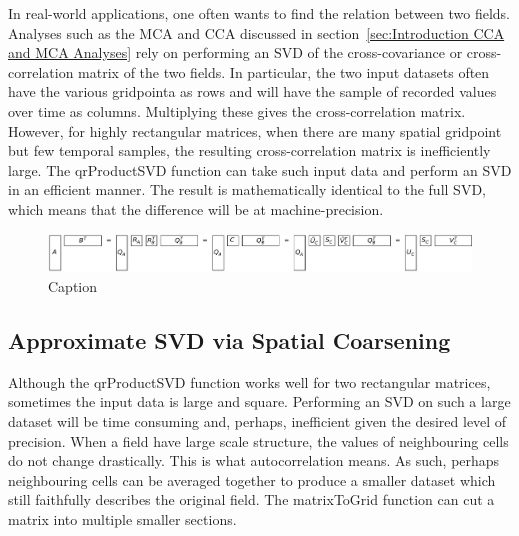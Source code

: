 \documentclass{acm_proc_article-sp}
\begin{document}
In real-world applications, one often wants to find the relation between two fields. Analyses such as the MCA and CCA discussed in section~\ref{sec:Introduction CCA and MCA Analyses} rely on performing an SVD of the cross-covariance or cross-correlation matrix of the two fields. In particular, the two input datasets often have the various gridpointa as rows and will have the sample of recorded values over time as columns. Multiplying these gives the cross-correlation matrix. However, for highly rectangular matrices, when there are many spatial gridpoint but few temporal samples, the resulting cross-correlation matrix is inefficiently large. The qrProductSVD function can take such input data and perform an SVD in an efficient manner. The result is mathematically identical to the full SVD, which means that the difference will be at machine-precision.

\begin{figure}[h]
\begin{center}
\includegraphics[width=\columnwidth]{Results/qrProductSVD.pdf}
\caption[Small caption]{Caption}
\label{fig:qrProductSVD}
\end{center}
\end{figure}
\subsection{Approximate SVD via Spatial Coarsening}
\label{sec:Techniques Approximate SVD via Spatial Coarsening}

Although the qrProductSVD function works well for two rectangular matrices, sometimes the input data is large and square. Performing an SVD on such a large dataset will be time consuming and, perhaps, inefficient given the desired level of precision. When a field have large scale structure, the values of neighbouring cells do not change drastically. This is what autocorrelation means. As such, perhaps neighbouring cells can be averaged together to produce a smaller dataset which still faithfully describes the original field. The matrixToGrid function can cut a matrix into multiple smaller sections.
\end{document}
